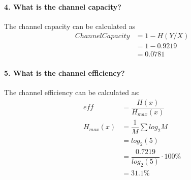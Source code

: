 \documentclass[Main]{subfiles}
\begin{document}
\paragraph{4.  What is the channel capacity?}
The channel capacity can be calculated as 
\begin{align}
ChannelCapacity &= 1- H(Y/X)\\
	&= 1 - 0.9219\\
	&= 0.0781
\end{align}


\paragraph{5.  What is the channel efficiency?}
The channel efficiency can be calculated as:
\begin{align}
eff &= \dfrac{H(x)}{H_{max}(x)} \\
H_{max}(x) &= \dfrac{1}{M} \sum log_2 M\\
	&= log_2(5)\\
	&= \dfrac{0.7219}{log_2(5)} \cdot 100\% \\
	&= 31.1\%
\end{align}
\end{document}
